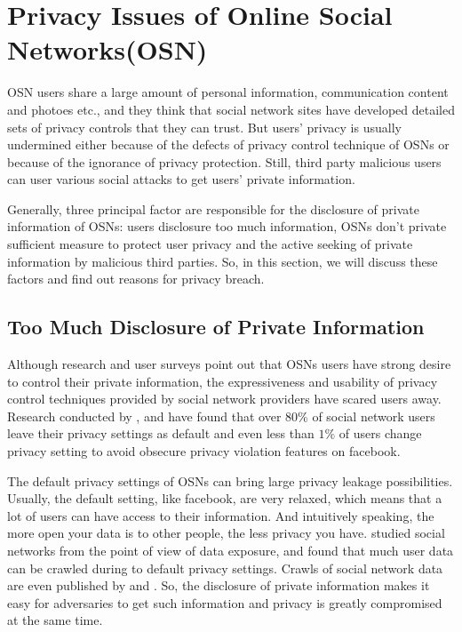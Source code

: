 \documentclass[12pt]{article}
\begin{document}
\section{Privacy Issues of Online Social Networks(OSN)\label{sec:threats}}
OSN users share a large amount of personal information, communication
content and photoes etc., and they think that social network sites
have developed detailed sets of privacy controls that they can
trust. But users' privacy is usually undermined either because of the
defects of privacy control technique of OSNs or because of the
ignorance of privacy protection. Still, third party malicious users
can user various social attacks to get users' private information.

Generally, three principal factor are responsible for the disclosure of
private information of OSNs\cite{threats-to-privacy}: users disclosure
too much information, OSNs don't private sufficient measure to protect
user privacy and the active seeking of private information by
malicious third parties. So, in this section, we will discuss these 
factors and find out reasons for privacy breach. 

\subsection{Too Much Disclosure of Private
  Information \label{subsec:infodisclosure}}
Although research and user surveys \cite{social-phishing}
\cite{granular-privacy-control} \cite{imagined-facebook-privacy} point
out that OSNs users have strong desire to control their private
information, the expressiveness and usability of privacy control
techniques provided by social network providers have scared users
away. Research conducted by \cite{imagined-facebook-privacy},
\cite{characterizing-privacy} and \cite{privacy-suites} have found
that over $80\%$ of social network users leave their privacy settings
as default and even less than $1\%$ of users change privacy setting to
avoid obsecure privacy violation features on
facebook\cite{prying-data-from-SN}. 

The default privacy settings of OSNs can bring large privacy
leakage possibilities. Usually, the default setting, like facebook, are
very relaxed, which means that a lot of users can have access to their
information. And intuitively speaking, the more open your data is to
other people, the less privacy you have. \cite{characterizing-privacy}
studied social networks from the point of view of data exposure, and
found that much user data can be crawled during to default privacy
settings. Crawls of social network data are even published by
\cite{parallel-crawl-SN} and \cite{measure-analyze-SN}. So, the
disclosure of private information makes it easy for adversaries to get
such information and privacy is greatly compromised at the same time. 
\end{document}
